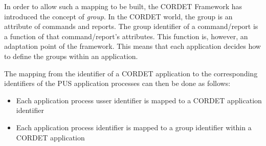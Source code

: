 In order to allow such a mapping to be built, the CORDET Framework has introduced the concept of \textit{group}. In the CORDET world, the group is an attribute of commands and reports. The group identifier of a command/report is a function of that command/report's attributes. This function is, however, an adaptation point of the framework. This means that each application decides how to define the groups within an application.

The mapping from the identifier of a CORDET application to the corresponding identifiers of the PUS application processes can then be done as follows:

\begin{itemize}
\item Each application process usser identifier is mapped to a CORDET application identifier
\item Each application process identifier is mapped to a group identifier within a CORDET application 
\end{itemize}


